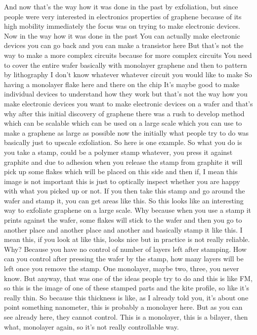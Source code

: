 And now that's the way how it was done in the past by exfoliation, but since people were very interested in electronics properties of graphene because of its high mobility immediately the focus was on trying to make electronic devices. Now in the way how it was done in the past You can actually make electronic devices you can go back and you can make a transistor here But that's not the way to make a more complex circuits because for more complex circuits You need to cover the entire wafer basically with monolayer graphene and then to pattern by lithography I don't know whatever whatever circuit you would like to make So having a monolayer flake here and there on the chip It's maybe good to make individual devices to understand how they work but that's not the way how you make electronic devices you want to make electronic devices on a wafer and that's why after this initial discovery of graphene there was a rush to develop method which can be scalable which can be used on a large scale which you can use to make a graphene as large as possible now the initially what people try to do was basically just to upscale exfoliation. So here is one example. So what you do is you take a stamp, could be a polymer stamp whatever, you press it against graphite and due to adhesion when you release the stamp from graphite it will pick up some flakes which will be placed on this side and then if, I mean this image is not important this is just to optically inspect whether you are happy with what you picked up or not. If you then take this stamp and go around the wafer and stamp it, you can get areas like this. So this looks like an interesting way to exfoliate graphene on a large scale. Why because when you use a stamp it prints against the wafer, some flakes will stick to the wafer and then you go to another place and another place and another and basically stamp it like this. I mean this, if you look at like this, looks nice but in practice is not really reliable. Why? Because you have no control of number of layers left after stamping. How can you control after pressing the wafer by the stamp, how many layers will be left once you remove the stamp. One monolayer, maybe two, three, you never know. But anyway, that was one of the ideas people try to do and this is like FM, so this is the image of one of these stamped parts and the kite profile, so like it's really thin. So because this thickness is like, as I already told you, it's about one point something nanometer, this is probably a monolayer here. But as you can see already here, they cannot control. This is a monolayer, this is a bilayer, then what, monolayer again, so it's not really controllable way.
